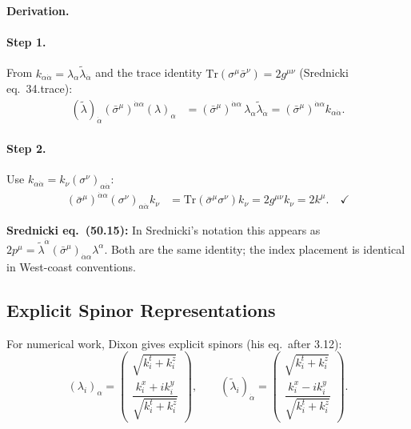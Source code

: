 \textbf{Derivation.}

\paragraph{Step 1.} From $k_{\alpha\dot\alpha}=\lambda_\alpha\tilde\lambda_{\dot\alpha}$ and
the trace identity $\mathrm{Tr}(\sigma^\mu\bar\sigma^\nu)=2g^{\mu\nu}$ (Srednicki eq.~34.trace):
\begin{align}
  (\tilde\lambda)_{\dot\alpha}(\bar\sigma^\mu)^{\dot\alpha\alpha}(\lambda)_\alpha
  &= (\bar\sigma^\mu)^{\dot\alpha\alpha}\,\lambda_\alpha\tilde\lambda_{\dot\alpha}
   = (\bar\sigma^\mu)^{\dot\alpha\alpha}k_{\alpha\dot\alpha}.
\end{align}

\paragraph{Step 2.} Use $k_{\alpha\dot\alpha}=k_\nu(\sigma^\nu)_{\alpha\dot\alpha}$:
\begin{align}
  (\bar\sigma^\mu)^{\dot\alpha\alpha}(\sigma^\nu)_{\alpha\dot\alpha}k_\nu
  &= \mathrm{Tr}(\bar\sigma^\mu\sigma^\nu)k_\nu
   = 2g^{\mu\nu}k_\nu = 2k^\mu. \quad\checkmark
\end{align}

\textbf{Srednicki eq.~(50.15):} In Srednicki's notation this appears as
$2p^\mu = \tilde\lambda^{\dot\alpha}(\bar\sigma^\mu)_{\dot\alpha\alpha}\lambda^\alpha$.
Both are the same identity; the index placement is identical in West-coast conventions.

\subsection{Explicit Spinor Representations}

For numerical work, Dixon gives explicit spinors (his eq.~after 3.12):
\begin{equation}
  (\lambda_i)_\alpha = \begin{pmatrix}\sqrt{k_i^t+k_i^z}\\
    \dfrac{k_i^x+ik_i^y}{\sqrt{k_i^t+k_i^z}}\end{pmatrix},
  \qquad
  (\tilde\lambda_i)_{\dot\alpha} = \begin{pmatrix}\sqrt{k_i^t+k_i^z}\\
    \dfrac{k_i^x-ik_i^y}{\sqrt{k_i^t+k_i^z}}\end{pmatrix}.
  \tag{Dixon after 3.12}
\end{equation}

